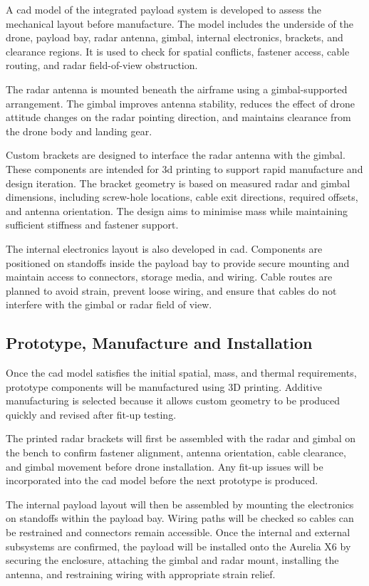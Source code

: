 A \gls{cad} model of the integrated payload system is developed to assess the mechanical layout before manufacture. The model includes the underside of the drone, payload bay, radar antenna, gimbal, internal electronics, brackets, and clearance regions. It is used to check for spatial conflicts, fastener access, cable routing, and radar field-of-view obstruction.

The radar antenna is mounted beneath the airframe using a gimbal-supported arrangement. The gimbal improves antenna stability, reduces the effect of drone attitude changes on the radar pointing direction, and maintains clearance from the drone body and landing gear.

Custom brackets are designed to interface the radar antenna with the gimbal. These components are intended for \gls{3d} printing to support rapid manufacture and design iteration. The bracket geometry is based on measured radar and gimbal dimensions, including screw-hole locations, cable exit directions, required offsets, and antenna orientation. The design aims to minimise mass while maintaining sufficient stiffness and fastener support.

The internal electronics layout is also developed in \gls{cad}. Components are positioned on standoffs inside the payload bay to provide secure mounting and maintain access to connectors, storage media, and wiring. Cable routes are planned to avoid strain, prevent loose wiring, and ensure that cables do not interfere with the gimbal or radar field of view.

\subsection{Prototype, Manufacture and Installation}

Once the \gls{cad} model satisfies the initial spatial, mass, and thermal requirements, prototype components will be manufactured using 3D printing. Additive manufacturing is selected because it allows custom geometry to be produced quickly and revised after fit-up testing.

The printed radar brackets will first be assembled with the radar and gimbal on the bench to confirm fastener alignment, antenna orientation, cable clearance, and gimbal movement before drone installation. Any fit-up issues will be incorporated into the \gls{cad} model before the next prototype is produced.

The internal payload layout will then be assembled by mounting the electronics on standoffs within the payload bay. Wiring paths will be checked so cables can be restrained and connectors remain accessible. Once the internal and external subsystems are confirmed, the payload will be installed onto the Aurelia X6 by securing the enclosure, attaching the gimbal and radar mount, installing the antenna, and restraining wiring with appropriate strain relief.


